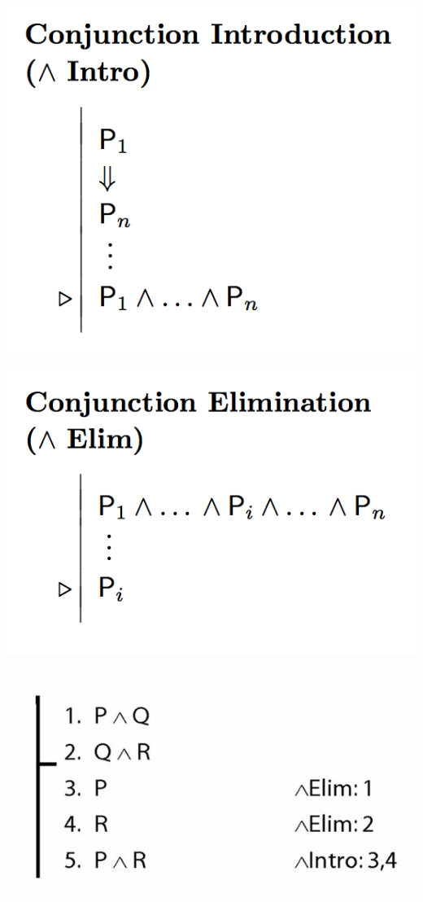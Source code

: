 \documentclass[12pt]{extarticle}
\begin{document}
\begin{multicols*}{3}
\begin{center}
\includegraphics[scale=0.3]{img/rule_conjunction_intro.png}
\end{center}
\begin{center}
\includegraphics[scale=0.3]{img/rule_conjunction_elim.png}
\end{center}
\begin{center}
\includegraphics[scale=0.3]{img/proof_unit_21.png}
\end{center}
 

\end{multicols*}
\end{document}
